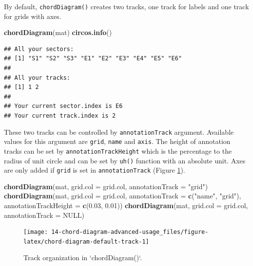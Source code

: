 \documentclass[]{book}
\newenvironment{Shaded}{\begin{snugshade}}{\end{snugshade}}
\newcommand{\KeywordTok}[1]{\textcolor[rgb]{0.13,0.29,0.53}{\textbf{#1}}}
\newcommand{\DataTypeTok}[1]{\textcolor[rgb]{0.13,0.29,0.53}{#1}}
\newcommand{\FloatTok}[1]{\textcolor[rgb]{0.00,0.00,0.81}{#1}}
\newcommand{\StringTok}[1]{\textcolor[rgb]{0.31,0.60,0.02}{#1}}
\newcommand{\OtherTok}[1]{\textcolor[rgb]{0.56,0.35,0.01}{#1}}
\newcommand{\NormalTok}[1]{#1}
\begin{document}
By default, \texttt{chordDiagram()} creates two tracks, one track for
labels and one track for grids with axes.

\begin{Shaded}
\begin{Highlighting}[]
\KeywordTok{chordDiagram}\NormalTok{(mat)}
\KeywordTok{circos.info}\NormalTok{()}
\end{Highlighting}
\end{Shaded}

\begin{verbatim}
## All your sectors:
## [1] "S1" "S2" "S3" "E1" "E2" "E3" "E4" "E5" "E6"
## 
## All your tracks:
## [1] 1 2
## 
## Your current sector.index is E6
## Your current track.index is 2
\end{verbatim}

These two tracks can be controlled by \texttt{annotationTrack} argument.
Available values for this argument are \texttt{grid}, \texttt{name} and
\texttt{axis}. The height of annotation tracks can be set by
\texttt{annotationTrackHeight} which is the percentage to the radius of
unit circle and can be set by \texttt{uh()} function with an absolute
unit. Axes are only added if \texttt{grid} is set in
\texttt{annotationTrack} (Figure \ref{fig:chord-diagram-default-track}).

\begin{Shaded}
\begin{Highlighting}[]
\KeywordTok{chordDiagram}\NormalTok{(mat, }\DataTypeTok{grid.col =}\NormalTok{ grid.col, }\DataTypeTok{annotationTrack =} \StringTok{"grid"}\NormalTok{)}
\KeywordTok{chordDiagram}\NormalTok{(mat, }\DataTypeTok{grid.col =}\NormalTok{ grid.col, }\DataTypeTok{annotationTrack =} \KeywordTok{c}\NormalTok{(}\StringTok{"name"}\NormalTok{, }\StringTok{"grid"}\NormalTok{),}
    \DataTypeTok{annotationTrackHeight =} \KeywordTok{c}\NormalTok{(}\FloatTok{0.03}\NormalTok{, }\FloatTok{0.01}\NormalTok{))}
\KeywordTok{chordDiagram}\NormalTok{(mat, }\DataTypeTok{grid.col =}\NormalTok{ grid.col, }\DataTypeTok{annotationTrack =} \OtherTok{NULL}\NormalTok{)}
\end{Highlighting}
\end{Shaded}

\begin{figure}

{\centering \texttt{[image: 14-chord-diagram-advanced-usage\_files/figure-latex/chord-diagram-default-track-1]} 

}

\caption{Track organization in `chordDiagram()`.}\label{fig:chord-diagram-default-track}
\end{figure}
\end{document}
